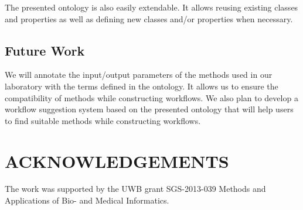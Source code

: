 \documentclass[a4paper,twoside]{article}
\begin{document}
The presented ontology is also easily extendable. It allows reusing existing classes and properties as well as defining new classes and/or properties when necessary.

\subsection{Future Work}
\noindent We will annotate the input/output parameters of the methods used in our laboratory with the terms defined in the ontology. It allows us to ensure the compatibility of methods while constructing workflows. We also plan to develop a workflow suggestion system based on the presented ontology that will help users to find suitable methods while constructing workflows.


\section*{\uppercase{Acknowledgements}}

\noindent The work was supported by the UWB grant SGS-2013-039 Methods and Applications of Bio- and Medical Informatics.


\vfill

{\small
}



\vfill
\end{document}
